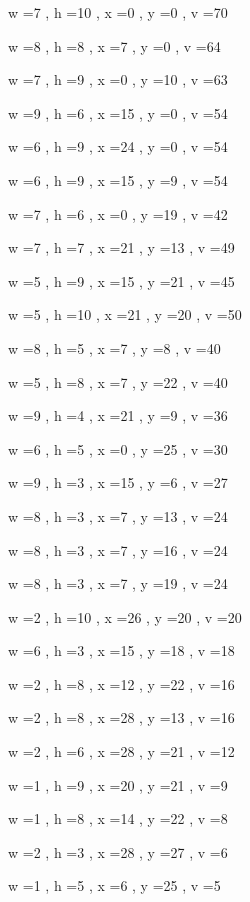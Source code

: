 \documentclass[11pt]{article}
\begin{document}
w =7 , h =10 , x =0 , y =0 , v =70
\par
w =8 , h =8 , x =7 , y =0 , v =64
\par
w =7 , h =9 , x =0 , y =10 , v =63
\par
w =9 , h =6 , x =15 , y =0 , v =54
\par
w =6 , h =9 , x =24 , y =0 , v =54
\par
w =6 , h =9 , x =15 , y =9 , v =54
\par
w =7 , h =6 , x =0 , y =19 , v =42
\par
w =7 , h =7 , x =21 , y =13 , v =49
\par
w =5 , h =9 , x =15 , y =21 , v =45
\par
w =5 , h =10 , x =21 , y =20 , v =50
\par
w =8 , h =5 , x =7 , y =8 , v =40
\par
w =5 , h =8 , x =7 , y =22 , v =40
\par
w =9 , h =4 , x =21 , y =9 , v =36
\par
w =6 , h =5 , x =0 , y =25 , v =30
\par
w =9 , h =3 , x =15 , y =6 , v =27
\par
w =8 , h =3 , x =7 , y =13 , v =24
\par
w =8 , h =3 , x =7 , y =16 , v =24
\par
w =8 , h =3 , x =7 , y =19 , v =24
\par
w =2 , h =10 , x =26 , y =20 , v =20
\par
w =6 , h =3 , x =15 , y =18 , v =18
\par
w =2 , h =8 , x =12 , y =22 , v =16
\par
w =2 , h =8 , x =28 , y =13 , v =16
\par
w =2 , h =6 , x =28 , y =21 , v =12
\par
w =1 , h =9 , x =20 , y =21 , v =9
\par
w =1 , h =8 , x =14 , y =22 , v =8
\par
w =2 , h =3 , x =28 , y =27 , v =6
\par
w =1 , h =5 , x =6 , y =25 , v =5
\par
\newpage
\end{document}
